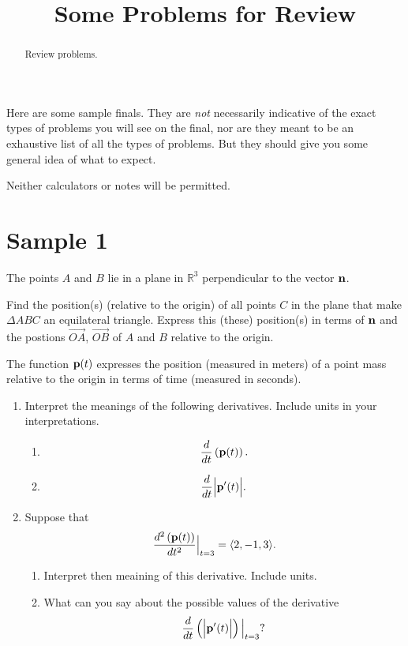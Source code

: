 \documentclass{ximera}
\title{Some Problems for Review}
\begin{document}
\begin{abstract}
Review problems.
\end{abstract}
\maketitle

Here are some sample finals. They are \emph{not} necessarily indicative of the exact types of problems you will see on the final, nor are they meant to be an exhaustive list of all the types of problems. But they should give you some general idea of what to expect.

Neither calculators or notes will be permitted. 

\section{Sample 1}

\begin{question}  \label{Qvftgbr45tg4rt}
The points $A$ and $B$ lie in a plane in $\mathbb{R}^3$ perpendicular to the vector ${\bf n}$.

Find the position(s) (relative to the origin) of all points $C$ in the plane that make $\Delta ABC$ an equilateral triangle. Express this (these) position(s) in terms of ${\bf n}$ and the postions $\overrightarrow{OA}$, $\overrightarrow{OB}$ of $A$ and $B$ relative to the origin.
\end{question}



\begin{question} \label{Qblhlh544tgg}
The function ${\bf p}(t)$ expresses the position (measured in meters) of a point mass relative to the origin in terms of time (measured in seconds).

\begin{enumerate}
\item Interpret the meanings of the following derivatives. Include units in your interpretations.
\begin{enumerate}
\item 
\[
  \frac{d}{dt} \left( {\bf p}(t)  \right).
\]

\item \[
  \frac{d}{dt} \Big| {\bf p}^\prime (t)  \Big|.
\]

\end{enumerate}

\item Suppose that
\[
   \frac{d^2 \left( {\bf p}(t)  \right)}{dt^2} \Big|_{t=3} = \langle 2, -1, 3 \rangle.
\]

\begin{enumerate}
\item Interpret then meaining of this derivative. Include units.

\item What can you say about the possible values of the derivative  
\[
  \frac{d}{dt}\left( \Big| {\bf p}^\prime (t)  \Big| \right) \Big|_{t=3}? 
\]
\end{enumerate}

\end{enumerate}

\end{question}
\end{document}
